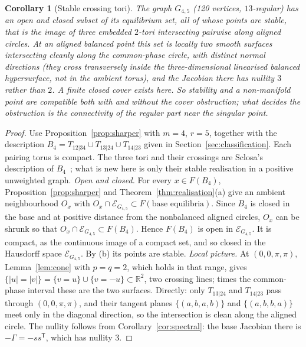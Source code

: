 \documentclass[11pt,a4paper]{article}
\newtheorem{corollary}[theorem]{Corollary}
\theoremstyle{definition}\newtheorem{conjecture}{Conjecture}
\theoremstyle{remark}\newtheorem{remark}[theorem]{Remark}
\newcommand{\R}{\mathbb R}
\newcommand{\E}{\mathcal E}
\begin{document}
\begin{corollary}[Stable crossing tori]\label{cor:crossing}
The graph $G_{4,5}$ (120 vertices, $13$-regular) has an open and closed subset of its equilibrium set, all of whose points are stable, that is the image of three embedded $2$-tori intersecting pairwise along aligned circles. At an aligned balanced point this set is locally two smooth surfaces intersecting cleanly along the common-phase circle, with distinct normal directions (they cross transversely inside the three-dimensional linearised balanced hypersurface, not in the ambient torus), and the Jacobian there has nullity $3$ rather than $2$. A finite closed cover exists here. So stability and a non-manifold point are compatible both with and without the cover obstruction; what decides the obstruction is the connectivity of the regular part near the singular point.
\end{corollary}
\begin{proof}
Use Proposition~\ref{prop:sharper} with $m=4$, $r=5$, together with the description $B_4=T_{12|34}\cup T_{13|24}\cup T_{14|23}$ given in Section~\ref{sec:classification}. Each pairing torus is compact. The three tori and their crossings are Sclosa's description of $B_4$~\cite{sclosa23}; what is new here is only their stable realisation in a positive unweighted graph. \emph{Open and closed.} For every $x\in F(B_4)$, Proposition~\ref{prop:sharper} and Theorem~\ref{thm:realisation}(a) give an ambient neighbourhood $O_x$ with $O_x\cap\E_{G_{4,5}}\subset F(\text{base equilibria})$. Since $B_4$ is closed in the base and at positive distance from the nonbalanced aligned circles, $O_x$ can be shrunk so that $O_x\cap\E_{G_{4,5}}\subset F(B_4)$. Hence $F(B_4)$ is open in $\E_{G_{4,5}}$. It is compact, as the continuous image of a compact set, and so closed in the Hausdorff space $\E_{G_{4,5}}$. By (b) its points are stable. \emph{Local picture.} At $(0,0,\pi,\pi)$, Lemma~\ref{lem:cone} with $p=q=2$, which holds in that range, gives $\{|u|=|v|\}=\{v=u\}\cup\{v=-u\}\subset\R^2$, two crossing lines; times the common-phase interval these are the two surfaces. Directly: only $T_{13|24}$ and $T_{14|23}$ pass through $(0,0,\pi,\pi)$, and their tangent planes $\{(a,b,a,b)\}$ and $\{(a,b,b,a)\}$ meet only in the diagonal direction, so the intersection is clean along the aligned circle. The nullity follows from Corollary~\ref{cor:spectral}: the base Jacobian there is $-\Gamma=-ss^{\mathsf T}$, which has nullity $3$.
\end{proof}
\end{document}
